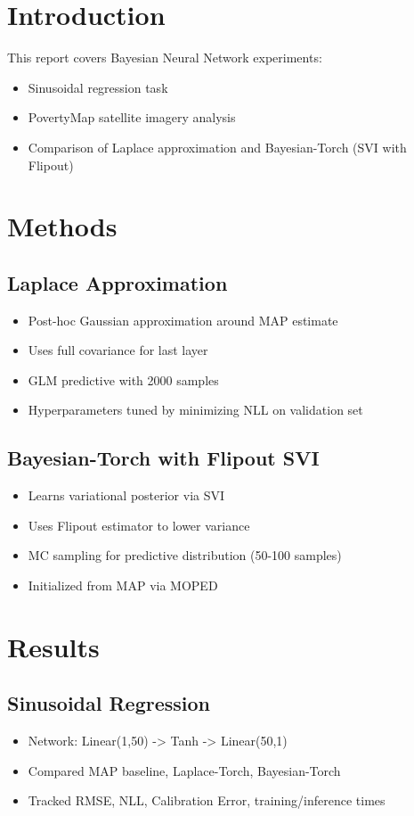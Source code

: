 \documentclass{article}
\begin{document}
\section{Introduction}
This report covers Bayesian Neural Network experiments:
\begin{itemize}
\item Sinusoidal regression task
\item PovertyMap satellite imagery analysis
\item Comparison of Laplace approximation and Bayesian-Torch (SVI with Flipout)
\end{itemize}

\section{Methods}
\subsection{Laplace Approximation}
\begin{itemize}
\item Post-hoc Gaussian approximation around MAP estimate
\item Uses full covariance for last layer
\item GLM predictive with 2000 samples
\item Hyperparameters tuned by minimizing NLL on validation set
\end{itemize}

\subsection{Bayesian-Torch with Flipout SVI}
\begin{itemize}
\item Learns variational posterior via SVI
\item Uses Flipout estimator to lower variance
\item MC sampling for predictive distribution (50-100 samples)
\item Initialized from MAP via MOPED
\end{itemize}

\section{Results}
\subsection{Sinusoidal Regression}
\begin{itemize}
\item Network: Linear(1,50) -> Tanh -> Linear(50,1)
\item Compared MAP baseline, Laplace-Torch, Bayesian-Torch
\item Tracked RMSE, NLL, Calibration Error, training/inference times
\end{itemize}
\end{document}
